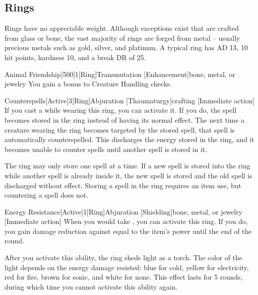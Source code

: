    \subsection{Rings}

         Rings have no appreciable weight.
        Although exceptions exist that are crafted from glass or bone, the vast majority of rings are forged from metal -- usually precious metals such as gold, silver, and platinum.
        A typical ring has AD 13, 10 hit points, hardness 10, and a break DR of 25.

        \begin{magicitemdef}{Animal Friendship}[500]{1}[Ring]{Transmutation [Enhancement]}{bone, metal, or jewelry}
             You gain a  bonus to Creature Handling checks.
        \end{magicitemdef}

        \begin{magicitemdef}{Counterspells}[Active]{3}[Ring]{Abjuration [Thaumaturgy]}{crafting}
            [Immediate action] If you cast a  while wearing this ring, you can activate it.
            If you do, the spell becomes stored in the ring instead of having its normal effect.
            The next time a creature wearing the ring becomes targeted by the stored spell, that spell is automatically counterspelled.
            This discharges the energy stored in the ring, and it becomes unable to counter spells until another spell is stored in it.

            The ring may only store one spell at a time.
            If a new spell is stored into the ring while another spell is already inside it, the new spell is stored and the old spell is discharged without effect.
            Storing a spell in the ring requires an item use, but countering a spell does not.
        \end{magicitemdef}

        \begin{magicitemdef}{Energy Resistance}[Active]{1}[Ring]{Abjuration [Shielding]}{bone, metal, or jewelry}
            [Immediate action] When you would take , you can activate this ring.
            If you do, you gain damage reduction against  equal to the item's power until the end of the round.

            After you activate this ability, the ring sheds light as a torch.
            The color of the light depends on the energy damage resisted: blue for cold, yellow for electricity, red for fire, brown for sonic, and white for none.
            This effect lasts for 5 rounds, during which time you cannot activate this ability again.
        \end{magicitemdef}

